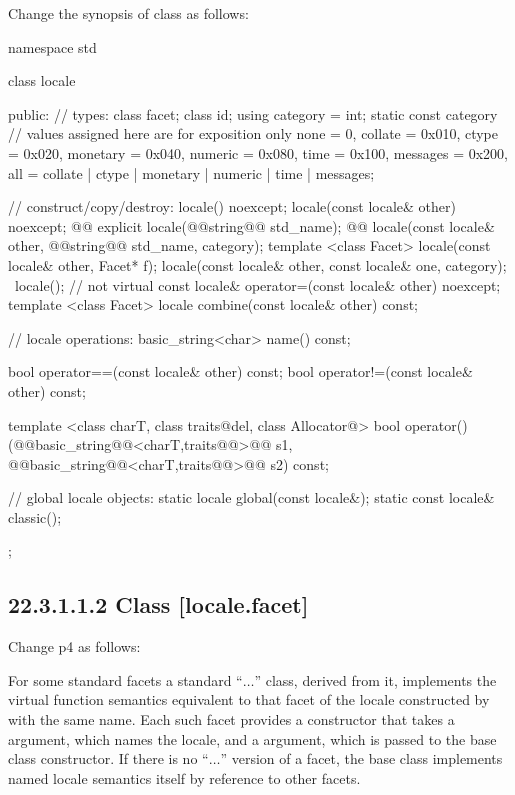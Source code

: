 \documentclass[ebook,11pt,article]{memoir}
\begin{document}
Change the synopsis of class  as follows:
\begin{codeblock}
namespace std {
  class locale {
  public:
    // types:
    class facet;
    class id;
    using category = int;
    static const category   // values assigned here are for exposition only
      none     = 0,
      collate  = 0x010, ctype    = 0x020,
      monetary = 0x040, numeric  = 0x080,
      time     = 0x100, messages = 0x200,
      all = collate | ctype | monetary | numeric | time  | messages;

    // construct/copy/destroy:
    locale() noexcept;
    locale(const locale& other) noexcept;
    @@
    explicit locale(@@string@\del{\&}@ std_name);
    @@
    locale(const locale& other, @@string@\del{\&}@ std_name, category);
    template <class Facet> locale(const locale& other, Facet* f);
    locale(const locale& other, const locale& one, category);
    ~locale();                  // not virtual
    const locale& operator=(const locale& other) noexcept;
    template <class Facet> locale combine(const locale& other) const;

    // locale operations:
    basic_string<char>                  name() const;

    bool operator==(const locale& other) const;
    bool operator!=(const locale& other) const;

    template <class charT, class traits@del{, class Allocator}@>
      bool operator()(@@basic_string@@<charT,traits@@>@\del{\&}@ s1,
                      @@basic_string@@<charT,traits@@>@\del{\&}@ s2) const;

    // global locale objects:
    static       locale  global(const locale&);
    static const locale& classic();
  };
}
\end{codeblock}

\subsection{22.3.1.1.2 Class  [locale.facet]}
Change p4 as follows:

\pnum
For some standard facets a standard
``$\ldots$''
class, derived from it, implements the virtual function semantics
equivalent to that facet of the locale constructed by
with the same name.
Each such facet provides a constructor that takes a
argument, which names the locale, and a 
argument, which is passed to the base class constructor.
If there is no
``$\ldots$''
version of a facet, the base class implements named locale
semantics itself by reference to other facets.
\end{document}
